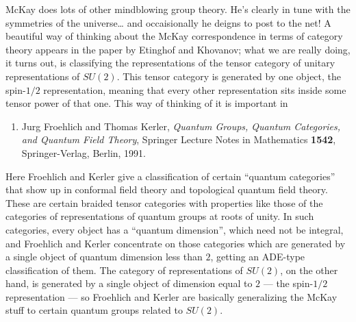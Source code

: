 \documentclass{article}
\def\tightlist{}
\renewcommand{\texttt}[1]{%
  \begingroup
  \ttfamily
  \begingroup\lccode`~=`/\lowercase{\endgroup\def~}{/\discretionary{}{}{}}%
  \begingroup\lccode`~=`[\lowercase{\endgroup\def~}{[\discretionary{}{}{}}%
  \begingroup\lccode`~=`.\lowercase{\endgroup\def~}{.\discretionary{}{}{}}%
  \catcode`/=\active\catcode`[=\active\catcode`.=\active
  \scantokens{#1\noexpand}%
  \endgroup
}
\begin{document}

McKay does lots of other mindblowing group theory. He's clearly in tune
with the symmetries of the universe\ldots{} and occaisionally he deigns
to post to the net! A beautiful way of thinking about the McKay
correspondence in terms of category theory appears in the paper by
Etinghof and Khovanov; what we are really doing, it turns out, is
classifying the representations of the tensor category of unitary
representations of \(SU(2)\). This tensor category is generated by one
object, the spin-\(1/2\) representation, meaning that every other
representation sits inside some tensor power of that one. This way of
thinking of it is important in

\begin{enumerate}
\def\labelenumi{\arabic{enumi})}
\setcounter{enumi}{4}
\tightlist
\item
  Jurg Froehlich and Thomas Kerler, \emph{Quantum Groups, Quantum
  Categories, and Quantum Field Theory}, Springer Lecture Notes in
  Mathematics \textbf{1542}, Springer-Verlag, Berlin, 1991.
\end{enumerate}

Here Froehlich and Kerler give a classification of certain ``quantum
categories'' that show up in conformal field theory and topological
quantum field theory. These are certain braided tensor categories with
properties like those of the categories of representations of quantum
groups at roots of unity. In such categories, every object has a
``quantum dimension'', which need not be integral, and Froehlich and
Kerler concentrate on those categories which are generated by a single
object of quantum dimension less than \(2\), getting an ADE-type
classification of them. The category of representations of \(SU(2)\), on
the other hand, is generated by a single object of dimension equal to
\(2\) --- the spin-\(1/2\) representation --- so Froehlich and Kerler
are basically generalizing the McKay stuff to certain quantum groups
related to \(SU(2)\).
\end{document}
